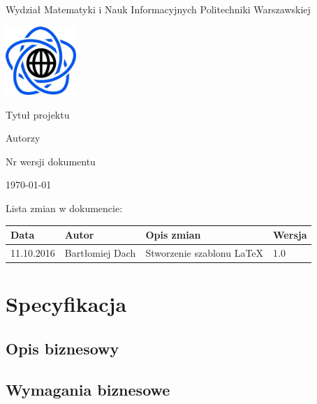 \documentclass[10pt,a4paper]{article}
\begin{document}
\begin{titlepage}
	\centering
	{\Large Wydział Matematyki i Nauk Informacyjnych Politechniki Warszawskiej \par}
	\vspace{1cm}
	\includegraphics[width=0.2\textwidth]{logo.png} \par
	\vspace{5cm}
	{\LARGE Tytuł projektu \par}
	\vspace{0.5cm}
	{\Large Autorzy \par}
	\vspace{1.5cm}
	{\Large Nr wersji dokumentu \par}
	\vspace{1.5cm}
	{\Large \today \par}
\end{titlepage}
Lista zmian w dokumencie:
\begin{table}[H]
\def\arraystretch{1.5}
\begin{tabularx}{\textwidth}{|l|l|X|l|}
	\hline
	\textbf{Data} & \textbf{Autor} & \textbf{Opis zmian} & \textbf{Wersja} \\
	\hline
	11.10.2016 & Bartłomiej Dach & Stworzenie szablonu \LaTeX & 1.0 \\
	\hline
\end{tabularx}
\end{table}

\tableofcontents
\newpage

\section{Specyfikacja}

\subsection{Opis biznesowy}
%

\subsection{Wymagania biznesowe}
%
\end{document}

